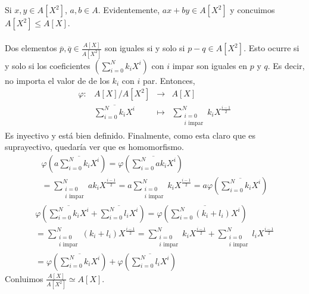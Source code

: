 \documentclass{article}
\begin{document}
\begin{multicols}{2}
\section{}
\noindent Si $x,y\in A[X^2]$, $a,b\in A$. Evidentemente, $ax+by \in A[X^2]$ y concuimos $A[X^2]\le A[X]$.\\\\
Dos elementos $\overline{p},\overline{q}\in\frac{A[X]}{A[X^2]}$ son iguales si y solo si $p-q\in A[X^2]$. Esto ocurre si y solo si los coeficientes $\left( \sum_{i=0}^N k_i X^i\right)$ con $i$ impar son iguales en $p$ y $q$. Es decir, no importa el valor de de los $k_i$ con $i$ par. Entonces,
$$
\begin{array}{crcl}
\varphi : & A[X]/A[X^2] & \longrightarrow & A[X] \\
& \displaystyle\overline{\sum_{i=0}^N k_i X^i} & \longmapsto     & \displaystyle\sum_{\substack{i=0 \\ i \text{ impar}}}^N k_iX^{\frac{i-1}{2}}
\end{array}
$$
Es inyectivo y está bien definido. Finalmente, como esta claro que es suprayectivo, quedaría ver que es homomorfismo.
$$
\begin{array}{c}
    \displaystyle\varphi\left(a\overline{\sum_{i=0}^N k_i X^i}\right) = \displaystyle\varphi\left(\overline{\sum_{i=0}^N ak_i X^i}\right) \\
    = \displaystyle\sum_{\substack{i=0 \\ i \text{ impar}}}^N ak_iX^{\frac{i-1}{2}} = \displaystyle a \sum_{\substack{i=0 \\ i \text{ impar}}}^N k_iX^{\frac{i-1}{2}} = \displaystyle a \varphi\left(\overline{\sum_{i=0}^N k_i X^i}\right)
\end{array}
$$
$$
\begin{array}{c}
    \displaystyle\varphi\left(\overline{\sum_{i=0}^N k_i X^i} + \overline{\sum_{i=0}^N l_i X^i}\right) = \varphi\left(\overline{\sum_{i=0}^N (k_i+l_i) X^i}\right) \\
    \displaystyle = \sum_{\substack{i=0 \\ i \text{ impar}}}^N (k_i+l_i)X^{\frac{i-1}{2}} = \sum_{\substack{i=0 \\ i \text{ impar}}}^N k_iX^{\frac{i-1}{2}} + \sum_{\substack{i=0 \\ i \text{ impar}}}^N l_iX^{\frac{i-1}{2}} \\
    \displaystyle = \varphi\left(\overline{\sum_{i=0}^N k_i X^i}\right) + \varphi\left(\overline{\sum_{i=0}^N l_i X^i}\right)
\end{array}
$$
Conluimos $\displaystyle\frac{A[X]}{A[X^2]} \simeq A[X]$.
\end{multicols}
\end{document}
